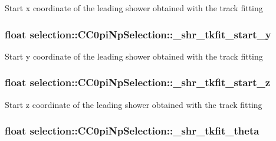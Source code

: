 Start x coordinate of the leading shower obtained with the track fitting \hypertarget{classselection_1_1CC0piNpSelection_acd1826c44855b71bce92253f7ac1a758}{
\subsubsection[{\-\_\-shr\-\_\-tkfit\-\_\-start\-\_\-y}]{\setlength{\rightskip}{0pt plus 5cm}float selection\-::\-C\-C0pi\-Np\-Selection\-::\-\_\-shr\-\_\-tkfit\-\_\-start\-\_\-y\hspace{0.3cm}{\ttfamily [private]}}}\label{classselection_1_1CC0piNpSelection_acd1826c44855b71bce92253f7ac1a758}
Start y coordinate of the leading shower obtained with the track fitting \hypertarget{classselection_1_1CC0piNpSelection_a4d3591a8bb7abd9e320f35ca3bf311c2}{
\subsubsection[{\-\_\-shr\-\_\-tkfit\-\_\-start\-\_\-z}]{\setlength{\rightskip}{0pt plus 5cm}float selection\-::\-C\-C0pi\-Np\-Selection\-::\-\_\-shr\-\_\-tkfit\-\_\-start\-\_\-z\hspace{0.3cm}{\ttfamily [private]}}}\label{classselection_1_1CC0piNpSelection_a4d3591a8bb7abd9e320f35ca3bf311c2}
Start z coordinate of the leading shower obtained with the track fitting \hypertarget{classselection_1_1CC0piNpSelection_a11df391e482434665c389423bbb9ec5d}{
\subsubsection[{\-\_\-shr\-\_\-tkfit\-\_\-theta}]{\setlength{\rightskip}{0pt plus 5cm}float selection\-::\-C\-C0pi\-Np\-Selection\-::\-\_\-shr\-\_\-tkfit\-\_\-theta\hspace{0.3cm}{\ttfamily [private]}}}\label{classselection_1_1CC0piNpSelection_a11df391e482434665c389423bbb9ec5d}
